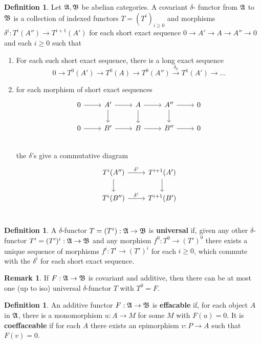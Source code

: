 \documentclass[10pt,reqno]{amsart}
\theoremstyle{definition}
\newtheorem{definition}[theorem]{Definition}
\newtheorem{remark}[theorem]{Remark}
\theoremstyle{remark}
\numberwithin{equation}{section}
\numberwithin{theorem}{section}
\begin{document}
\begin{definition} Let $\frak{A}, \frak{B}$ be abelian categories. A covariant $\delta$- functor from $\frak{A}$ to $\frak{B}$ is a collection of indexed functors $T = (T^i)_{i \ge 0}$ and morphisms $\delta^i: T^i(A'') \to T^{i+1}(A')$ for each short exact sequence $0 \to A' \to A \to A'' \to 0$ and each $i \ge 0$ such that
\begin{enumerate}
\item For each such short exact sequence, there is a long exact sequence
\[0 \to T^0(A') \to T^0(A) \to T^0(A'') \stackrel{\delta_0}{\to} T^1(A') \to \dots\]
\item for each morphism of short exact sequences
\[
\begin{tikzcd}
0 \arrow[r] & A' \arrow[r] \arrow[d] & A \arrow[r] \arrow[d] & A'' \arrow[r] \arrow[d]& 0 \\
0 \arrow[r] & B' \arrow[r] & B \arrow[r] & B'' \arrow[r] & 0 \\
\end{tikzcd}
\]
the $\delta$'s give a commutative diagram
\[
\begin{tikzcd}
T^i(A'') \arrow[d] \arrow[r,"\delta^i"] &T^{i+1}(A') \arrow[d]\\
T^i(B'') \arrow[r,"\delta^i"] &T^{i+1}(B')\\
\end{tikzcd}
\]
\end{enumerate}
\end{definition}

\begin{definition} A $\delta$-functor $T = (T^i): \frak{A} \to \frak{B}$ is \textbf{universal} if, given any other $\delta$-functor $T' = (T')^i: \frak{A} \to \frak{B}$ and any morphism $f^0: T^0 \to (T')^0$ there exists a unique sequence of morphisms $f^i: T^i \to (T')^i$ for each $i \ge 0$, which commute with the $\delta^i$ for each short exact sequence.
\end{definition}

\begin{remark}
If $F: \frak{A} \to \frak{B}$ is covariant and additive, then there can be at most one (up to iso) universal $\delta$-functor $T$ with $T^0 = F$.
\end{remark}

\begin{definition} An additive functor $F: \frak{A} \to \frak{B}$ is \textbf{effacable} if, for each object $A$ in $\frak{A}$, there is a monomorphism $u: A \to M$ for some $M$ with $F(u) = 0$. It is \textbf{coeffaceable} if for each $A$ there exists an epimorphism $v: P \to A$ such that $F(v) = 0$.
\end{definition}
\end{document}
